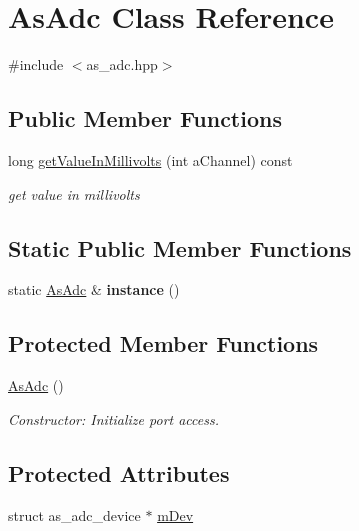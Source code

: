 \hypertarget{classAsAdc}{}\section{As\+Adc Class Reference}
\label{classAsAdc}


{\ttfamily \#include $<$as\+\_\+adc.\+hpp$>$}

\subsection*{Public Member Functions}
\begin{DoxyCompactItemize}
\item 
long \hyperlink{classAsAdc_aa06d943d659d9bebc1dc97ceaa3e2532}{get\+Value\+In\+Millivolts} (int a\+Channel) const
\begin{DoxyCompactList}\small\item\em get value in millivolts \end{DoxyCompactList}\end{DoxyCompactItemize}
\subsection*{Static Public Member Functions}
\begin{DoxyCompactItemize}
\item 
\mbox{\label{classAsAdc_ae00366ed74de0f48ac4158d466af03ed}} 
static \hyperlink{classAsAdc}{As\+Adc} \& {\bfseries instance} ()
\end{DoxyCompactItemize}
\subsection*{Protected Member Functions}
\begin{DoxyCompactItemize}
\item 
\hyperlink{classAsAdc_a5d5b99b5fa245480bcdba94e7753f798}{As\+Adc} ()
\begin{DoxyCompactList}\small\item\em Constructor\+: Initialize port access. \end{DoxyCompactList}\end{DoxyCompactItemize}
\subsection*{Protected Attributes}
\begin{DoxyCompactItemize}
\item 
struct as\+\_\+adc\+\_\+device $\ast$ \hyperlink{classAsAdc_a30bbfa90486f79898d1381efec02165f}{m\+Dev}
\end{DoxyCompactItemize}


